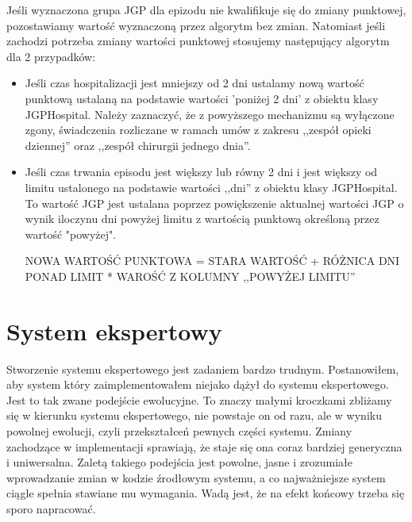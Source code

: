 Jeśli wyznaczona grupa JGP dla epizodu nie kwalifikuje się do zmiany punktowej, pozostawiamy wartość wyznaczoną przez algorytm bez zmian. Natomiast jeśli zachodzi potrzeba zmiany wartości punktowej stosujemy następujący algorytm dla 2 przypadków:
\begin{itemize}
\item Jeśli czas hospitalizacji jest mniejszy od 2 dni ustalamy nową wartość punktową ustalaną na podstawie wartości 'poniżej 2 dni' z obiektu klasy JGPHospital. Należy zaznaczyć, że z powyższego mechanizmu są wyłączone zgony, świadczenia rozliczane w ramach umów z zakresu ,,zespół opieki dziennej'' oraz ,,zespół chirurgii jednego dnia''.
\item Jeśli czas trwania episodu jest większy lub równy 2 dni i jest większy od limitu ustalonego na podstawie wartości ,,dni'' z obiektu klasy JGPHospital. To wartość JGP jest ustalana poprzez powiększenie aktualnej wartości JGP o wynik iloczynu dni powyżej limitu z wartością punktową określoną przez wartość "powyżej".

NOWA WARTOŚĆ PUNKTOWA = STARA WARTOŚĆ + RÓŻNICA DNI PONAD LIMIT * WAROŚĆ Z KOLUMNY ,,POWYŻEJ LIMITU''
\end{itemize} 

\section{System ekspertowy}
\label{sec:systemEkspertowy}

Stworzenie systemu ekspertowego jest zadaniem bardzo trudnym. Postanowiłem, aby system który zaimplementowałem niejako dążył do systemu ekspertowego. Jest to tak zwane podejście ewolucyjne. To znaczy małymi kroczkami zbliżamy się w kierunku systemu ekspertowego, nie powstaje on od razu, ale w wyniku powolnej ewolucji, czyli przekształceń pewnych części systemu. Zmiany zachodzące w implementacji sprawiają, że staje się ona coraz bardziej generyczna i uniwersalna. Zaletą takiego podejścia jest powolne, jasne i zrozumiałe wprowadzanie zmian w kodzie źrodłowym systemu, a co najważniejsze system ciągle spełnia stawiane mu wymagania. Wadą jest, że na efekt końcowy trzeba się sporo napracować.

